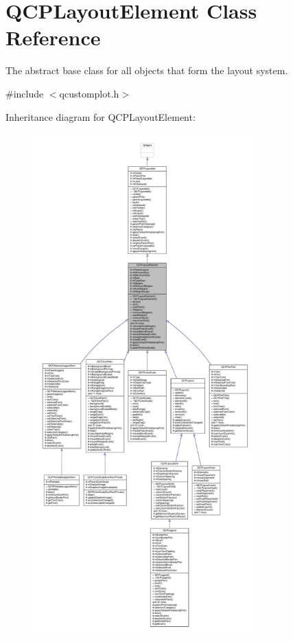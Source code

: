\hypertarget{class_q_c_p_layout_element}{}\section{Q\+C\+P\+Layout\+Element Class Reference}
\label{class_q_c_p_layout_element}


The abstract base class for all objects that form the layout system.  




{\ttfamily \#include $<$qcustomplot.\+h$>$}



Inheritance diagram for Q\+C\+P\+Layout\+Element\+:\nopagebreak
\begin{figure}[H]
\begin{center}
\leavevmode
\includegraphics[height=550pt]{class_q_c_p_layout_element__inherit__graph}
\end{center}
\end{figure}


